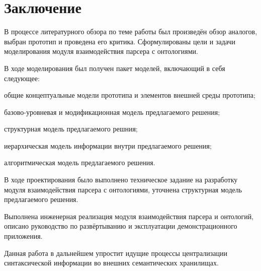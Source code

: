 \indent \section{Заключение}

В процессе литературного обзора по теме работы был произведён обзор аналогов, выбран прототип и проведена его критика. Сформулированы цели и задачи моделирования модуля взаимодействия парсера с онтологиями.

В ходе моделирования был получен пакет моделей, включающий в себя следующее:
\begin{list}{}{\leftmargin=1.5cm}
	\item общие концептуальные модели прототипа и элементов внешней среды прототипа;
	\item базово-уровневая и модификационная модель предлагаемого решения;
	\item структурная модель предлагаемого решния;
	\item иерархическая модель информации внутри предлагаемого решения;
	\item алгоритмическая модель предлагаемого решения.
\end{list}

В ходе проектирования было выполнено техническое задание на разработку модуля взаимодействия парсера с онтологиями, уточнена структурная модель предлагаемого решения.

Выполнена инженерная реализация модуля взаимодействия парсера и онтологий, описано руководство по развёртыванию и эксплуатации демонстрационного приложения.

Данная работа в дальнейшем упростит идущие процессы централизации синтаксической информации во внешних семантических хранилищах.